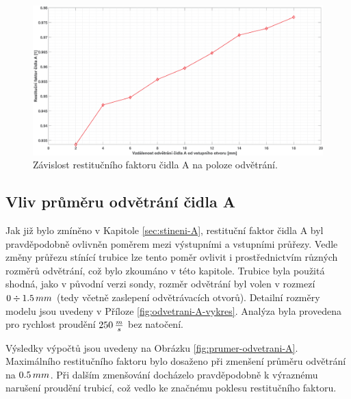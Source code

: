           \begin{figure}[ht!]
            \centering
            \includegraphics*[width=\textwidth]{400_SIMULACE_KONSTRUKCNICH_UPRAV/Grafy/06_poloha_odvetrani_A.eps}
            \caption{Závislost restitučního faktoru čidla A na poloze odvětrání.}
            \label{fig:poloha-odvetrani-A}
        \end{figure}
    
    \newpage
    \subsection{Vliv průměru odvětrání čidla A} \label{sec:prumer-odvetrani}
        Jak již bylo zmíněno v Kapitole \ref{sec:stineni-A}, restituční faktor čidla A byl pravděpodobně ovlivněn poměrem mezi výstupními a vstupními průřezy. Vedle změny průřezu stínící trubice lze tento poměr ovlivit i prostřednictvím různých rozměrů odvětrání, což bylo zkoumáno v této kapitole. Trubice byla použitá shodná, jako v původní verzi sondy, rozměr odvětrání byl volen v rozmezí $0 \div 1.5 \, mm$ (tedy včetně zaslepení odvětrávacích otvorů). Detailní rozměry modelu jsou uvedeny v Příloze \ref{fig:odvetrani-A-vykres}. Analýza byla provedena pro rychlost proudění $250 \, \frac{m}{s}$ bez natočení.

        Výsledky výpočtů jsou uvedeny na Obrázku \ref{fig:prumer-odvetrani-A}. Maximálního restitučního faktoru bylo dosaženo při zmenšení průměru odvětrání na $0.5 \, mm$. Při dalším zmenšování docházelo pravděpodobně k výraznému narušení proudění trubicí, což vedlo ke značnému poklesu restitučního faktoru.
        
